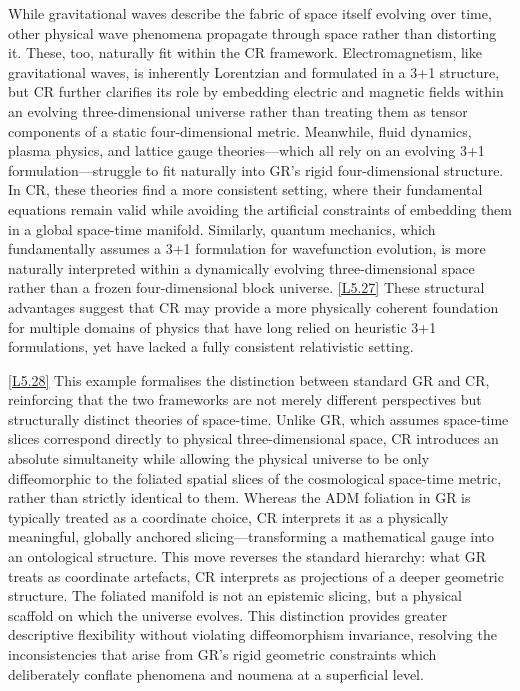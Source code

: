 \documentclass[12pt]{book}
\newcounter{logicanchor}
\newenvironment{logicanchorenv}[1]{\refstepcounter{logicanchor}\label{#1}}{}
\newcommand{\logiclink}[2]{\begin{logicanchorenv}{logic:#1}\end{logicanchorenv}\hyperref[appendix:#1]{[#1]}\xspace}
\begin{document}
While gravitational waves describe the fabric of space itself evolving over time, other physical wave phenomena propagate through space rather than distorting it. These, too, naturally fit within the CR framework. Electromagnetism, like gravitational waves, is inherently Lorentzian and formulated in a 3+1 structure, but CR further clarifies its role by embedding electric and magnetic fields within an evolving three-dimensional universe rather than treating them as tensor components of a static four-dimensional metric. Meanwhile, fluid dynamics, plasma physics, and lattice gauge theories---which all rely on an evolving 3+1 formulation---struggle to fit naturally into GR's rigid four-dimensional structure. In CR, these theories find a more consistent setting, where their fundamental equations remain valid while avoiding the artificial constraints of embedding them in a global space-time manifold. Similarly, quantum mechanics, which fundamentally assumes a 3+1 formulation for wavefunction evolution, is more naturally interpreted within a dynamically evolving three-dimensional space rather than a frozen four-dimensional block universe. \logiclink{L5.27}{} These structural advantages suggest that CR may provide a more physically coherent foundation for multiple domains of physics that have long relied on heuristic 3+1 formulations, yet have lacked a fully consistent relativistic setting.

\logiclink{L5.28}{} This example formalises the distinction between standard GR and CR, reinforcing that the two frameworks are not merely different perspectives but structurally distinct theories of space-time. Unlike GR, which assumes space-time slices correspond directly to physical three-dimensional space, CR introduces an absolute simultaneity while allowing the physical universe to be only diffeomorphic to the foliated spatial slices of the cosmological space-time metric, rather than strictly identical to them. Whereas the ADM foliation in GR is typically treated as a coordinate choice, CR interprets it as a physically meaningful, globally anchored slicing---transforming a mathematical gauge into an ontological structure. This move reverses the standard hierarchy: what GR treats as coordinate artefacts, CR interprets as projections of a deeper geometric structure. The foliated manifold is not an epistemic slicing, but a physical scaffold on which the universe evolves. This distinction provides greater descriptive flexibility without violating diffeomorphism invariance, resolving the inconsistencies that arise from GR's rigid geometric constraints which deliberately conflate phenomena and noumena at a superficial level. 
\end{document}
